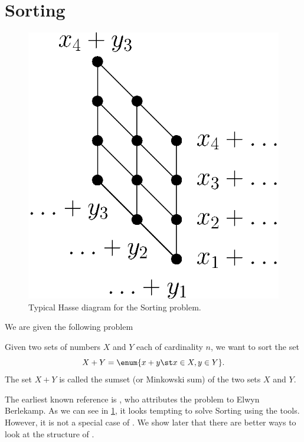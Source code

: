 \section{Sorting \XY}
\label{tree:related:xy}

\begin{figure}
	\centering
	\includegraphics[height=0.2\textheight]{fig/related/x+y}
	\caption{Typical Hasse diagram for the Sorting \XY problem.}
	\label{fig:related:xy}
\end{figure}

We are given the following problem
\begin{problem}[Sorting \XY]
Given two sets of numbers \(X\) and \(Y\) each of cardinality \(n\), we want to
sort the set
\begin{displaymath}
X + Y = \enum{x + y \st x \in X, y \in Y}.
\end{displaymath}
The set \(X + Y\) is called the sumset (or Minkowski sum) of the two sets \(X\) and
\(Y\).
\end{problem}

The earliest known reference is \citet*{fredman:1976}, who attributes
the problem to Elwyn Berlekamp. As we can see in \ref{fig:related:xy}, it
looks tempting to solve Sorting \XY using the \SUPI tools.
However, it is not a special case of \SUPI. We show later that
there are better ways to look at the structure of \XY.

